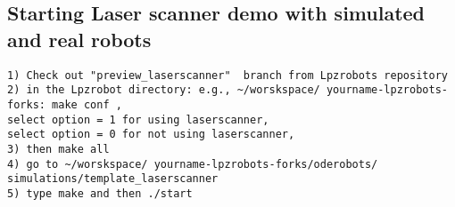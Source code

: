 \subsection{Starting Laser scanner demo with simulated and real robots}
\begin{lstlisting}
1) Check out "preview_laserscanner"  branch from Lpzrobots repository
2) in the Lpzrobot directory: e.g., ~/worskspace/ yourname-lpzrobots-forks: make conf , 
select option = 1 for using laserscanner, 
select option = 0 for not using laserscanner,
3) then make all
4) go to ~/worskspace/ yourname-lpzrobots-forks/oderobots/
simulations/template_laserscanner
5) type make and then ./start
\end{lstlisting}